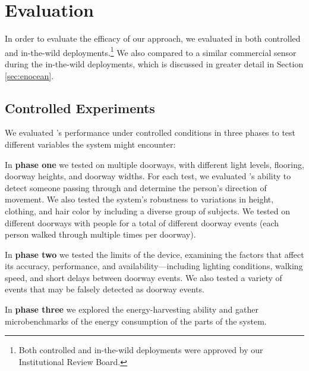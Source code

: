 \section{Evaluation}
\label{sec:evaluation}
In order to evaluate the efficacy of our approach, we evaluated \sysname in both controlled and in-the-wild deployments.\footnote{Both controlled and in-the-wild deployments were approved by our Institutional Review Board.}
We also compared \sysname to a similar commercial sensor during the in-the-wild deployments, which is discussed in greater detail in Section \ref{sec:enocean}.   

\subsection{Controlled Experiments} 
We evaluated \sysname's performance under controlled conditions in three phases to test different variables the system might encounter:

In \textbf{phase one} we tested \sysname on multiple doorways, with different light levels, flooring, doorway heights, and doorway widths.
For each test, we evaluated \sysname's ability to detect someone passing through and determine the person's direction of movement.
We also tested the system's robustness to variations in height, clothing, and hair color by including a diverse group of subjects.
We tested on \numDoors different doorways with \numPeople people for a total of \numExp different doorway events (each person walked through multiple times per doorway).

In \textbf{phase two} we tested the limits of the device, examining the factors that affect its accuracy, performance, and availability---including lighting conditions, walking speed, and short delays between doorway events.
We also tested a variety of events that may be falsely detected as doorway events.

In \textbf{phase three} we explored the energy-harvesting ability and gather microbenchmarks of the energy consumption of the parts of the \sysname system.


